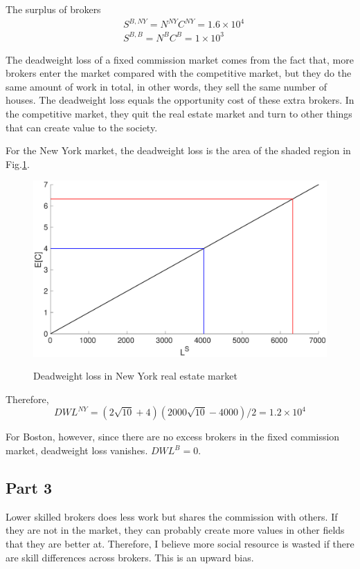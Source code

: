 \documentclass{article}
\begin{document}
The surplus of brokers
\begin{align*}
	&S^{B,NY}=N^{NY}C^{NY}=1.6\times 10^4\\
	&S^{B,B}=N^BC^B=1\times 10^3
\end{align*}

The deadweight loss of a fixed commission market comes from the fact that, more brokers enter the market compared with the competitive market, but they do the same amount of work in total, in other words, they sell the same number of houses. The deadweight loss equals the opportunity cost of these extra brokers. In the competitive market, they quit the real estate market and turn to other things that can create value to the society.

For the New York market, the deadweight loss is the area of the shaded region in Fig.\ref{DWL}.
\begin{figure}[!htbp]
	\centering
	\includegraphics[width=12cm]{figure5.eps}\\
	\caption{Deadweight loss in New York real estate market}
	\label{DWL}
\end{figure}

Therefore,
\begin{equation*}
	DWL^{NY}=(2\sqrt{10}+4)(2000\sqrt{10}-4000)/2=1.2\times 10^4
\end{equation*}

For Boston, however, since there are no excess brokers in the fixed commission market, deadweight loss vanishes. $DWL^B=0$.

\subsection{Part 3}
Lower skilled brokers does less work but shares the commission with others. If they are not in the market, they can probably create more values in other fields that they are better at. Therefore, I believe more social resource is wasted if there are skill differences across brokers. This is an upward bias.
\end{document}
